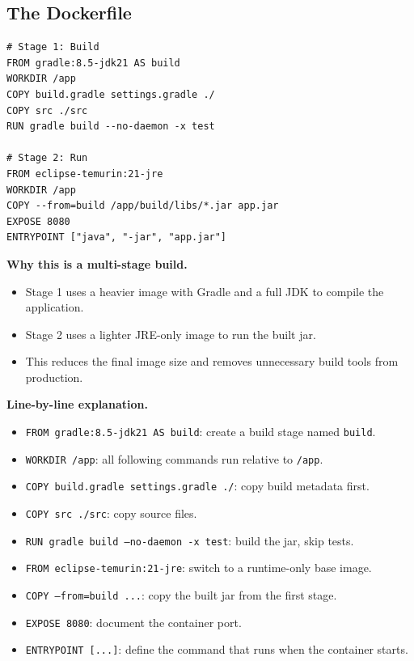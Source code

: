 \documentclass[a4paper,11pt]{article}
\begin{document}
\subsection{The Dockerfile}

\begin{lstlisting}[style=code, caption={MyService/Dockerfile}]
# Stage 1: Build
FROM gradle:8.5-jdk21 AS build
WORKDIR /app
COPY build.gradle settings.gradle ./
COPY src ./src
RUN gradle build --no-daemon -x test

# Stage 2: Run
FROM eclipse-temurin:21-jre
WORKDIR /app
COPY --from=build /app/build/libs/*.jar app.jar
EXPOSE 8080
ENTRYPOINT ["java", "-jar", "app.jar"]
\end{lstlisting}

\textbf{Why this is a multi-stage build.}

\begin{itemize}
  \item Stage 1 uses a heavier image with Gradle and a full JDK to compile the application.
  \item Stage 2 uses a lighter JRE-only image to run the built jar.
  \item This reduces the final image size and removes unnecessary build tools from production.
\end{itemize}

\textbf{Line-by-line explanation.}

\begin{itemize}
  \item \texttt{FROM gradle:8.5-jdk21 AS build}: create a build stage named \texttt{build}.
  \item \texttt{WORKDIR /app}: all following commands run relative to \texttt{/app}.
  \item \texttt{COPY build.gradle settings.gradle ./}: copy build metadata first.
  \item \texttt{COPY src ./src}: copy source files.
  \item \texttt{RUN gradle build --no-daemon -x test}: build the jar, skip tests.
  \item \texttt{FROM eclipse-temurin:21-jre}: switch to a runtime-only base image.
  \item \texttt{COPY --from=build ...}: copy the built jar from the first stage.
  \item \texttt{EXPOSE 8080}: document the container port.
  \item \texttt{ENTRYPOINT [...]}: define the command that runs when the container starts.
\end{itemize}
\end{document}
